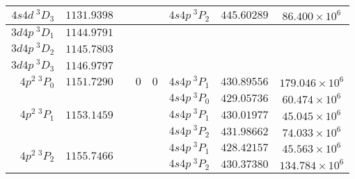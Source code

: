 \documentclass[aps,prx,10pt]{revtex4-2}
\begin{document}
\begin{longtable}{|r|c|c|c|c|r|c|c|}
\hline
$4s4d\ {}^{\mathrm{3}}\!D_3$&$1131.9398$&&&&$4s4p\ {}^{\mathrm{3}}\!P_2$&$445.60289$&$86.400\times10^6$\cite{zhouMagicPhys.Rev.A2010}\\
\hline
$3d4p\ {}^{\mathrm{3}}\!D_1$&$1144.9791$&&&&&&\\
\hline
$3d4p\ {}^{\mathrm{3}}\!D_2$&$1145.7803$&&&&&&\\
\hline
$3d4p\ {}^{\mathrm{3}}\!D_3$&$1146.9797$&&&&&&\\
\hline
$4p^2\ {}^{\mathrm{3}}\!P_0$&$1151.7290$&&$0$&$0$&$4s4p\ {}^{\mathrm{3}}\!P_1$&$430.89556$&$179.046\times10^6$\cite{zhouMagicPhys.Rev.A2010}\\
\hline
\multirow{3}{*}{$4p^2\ {}^{\mathrm{3}}\!P_1$}&\multirow{3}{*}{$1153.1459$}&\multirow{3}{*}{}&\multirow{3}{*}{}&\multirow{3}{*}{}&$4s4p\ {}^{\mathrm{3}}\!P_0$&$429.05736$&$60.474\times10^6$\cite{zhouMagicPhys.Rev.A2010}\\
\cline{6-8}
&&&&&$4s4p\ {}^{\mathrm{3}}\!P_1$&$430.01977$&$45.045\times10^{6}$\cite{zhouMagicPhys.Rev.A2010}\\
\cline{6-8}
&&&&&$4s4p\ {}^{\mathrm{3}}\!P_2$&$431.98662$&$74.033\times10^{6}$\cite{zhouMagicPhys.Rev.A2010}\\
\hline
\multirow{2}{*}{$4p^2\ {}^{\mathrm{3}}\!P_2$}&\multirow{2}{*}{$1155.7466$}&\multirow{2}{*}{}&\multirow{2}{*}{}&\multirow{2}{*}{}&$4s4p\ {}^{\mathrm{3}}\!P_1$&$428.42157$&$45.563\times10^{6}$\cite{zhouMagicPhys.Rev.A2010}\\
\cline{6-8}
&&&&&$4s4p\ {}^{\mathrm{3}}\!P_2$&$430.37380$&$134.784\times10^{6}$\cite{zhouMagicPhys.Rev.A2010}\\
\hline
\end{longtable}



\end{document}
